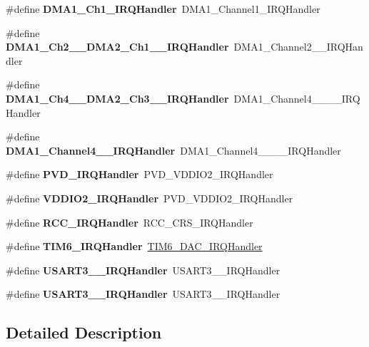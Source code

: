 \begin{DoxyCompactItemize}
\mbox{\label{group__stm32f072xb_ga3f7debe9fc2548ab6640825967110101}} 
\#define {\bfseries D\+M\+A1\+\_\+\+Ch1\+\_\+\+I\+R\+Q\+Handler}~D\+M\+A1\+\_\+\+Channel1\+\_\+\+I\+R\+Q\+Handler
\item 
\mbox{\label{group__stm32f072xb_ga3752ab0b9a6635ccd7bc87b99ee8fd9b}} 
\#define {\bfseries D\+M\+A1\+\_\+\+Ch2\+\_\+\_\+\+D\+M\+A2\+\_\+\+Ch1\+\_\+\_\+\+I\+R\+Q\+Handler}~D\+M\+A1\+\_\+\+Channel2\+\_\+\_\+\+I\+R\+Q\+Handler
\item 
\mbox{\label{group__stm32f072xb_ga035f9aa47c046222541cca70e281b415}} 
\#define {\bfseries D\+M\+A1\+\_\+\+Ch4\+\_\+\_\+\+D\+M\+A2\+\_\+\+Ch3\+\_\+\_\+\+I\+R\+Q\+Handler}~D\+M\+A1\+\_\+\+Channel4\+\_\+\_\+\_\+\_\+\+I\+R\+Q\+Handler
\item 
\mbox{\label{group__stm32f072xb_gac0e40c40e17f156c06448e594bf54eaf}} 
\#define {\bfseries D\+M\+A1\+\_\+\+Channel4\+\_\+\_\+\+I\+R\+Q\+Handler}~D\+M\+A1\+\_\+\+Channel4\+\_\+\_\+\_\+\_\+\+I\+R\+Q\+Handler
\item 
\mbox{\label{group__stm32f072xb_ga045476dfaec8c84f5e16b06b937c0c18}} 
\#define {\bfseries P\+V\+D\+\_\+\+I\+R\+Q\+Handler}~P\+V\+D\+\_\+\+V\+D\+D\+I\+O2\+\_\+\+I\+R\+Q\+Handler
\item 
\mbox{\label{group__stm32f072xb_gac1854dcfbcf2950cee25063d73a5edb0}} 
\#define {\bfseries V\+D\+D\+I\+O2\+\_\+\+I\+R\+Q\+Handler}~P\+V\+D\+\_\+\+V\+D\+D\+I\+O2\+\_\+\+I\+R\+Q\+Handler
\item 
\mbox{\label{group__stm32f072xb_ga5a6d083fa78461da86a717b28973e009}} 
\#define {\bfseries R\+C\+C\+\_\+\+I\+R\+Q\+Handler}~R\+C\+C\+\_\+\+C\+R\+S\+\_\+\+I\+R\+Q\+Handler
\item 
\mbox{\label{group__stm32f072xb_gae30e35a563a952a284f3f54d7f164ccd}} 
\#define {\bfseries T\+I\+M6\+\_\+\+I\+R\+Q\+Handler}~\hyperlink{group___h_a_l___time_base___t_i_m_ga0839a45f331c4c067939b9c4533bbf4d}{T\+I\+M6\+\_\+\+D\+A\+C\+\_\+\+I\+R\+Q\+Handler}
\item 
\mbox{\label{group__stm32f072xb_gaf04189172ff710986cd652a06e6f3f69}} 
\#define {\bfseries U\+S\+A\+R\+T3\+\_\+\_\+\+I\+R\+Q\+Handler}~U\+S\+A\+R\+T3\+\_\+\_\+\+I\+R\+Q\+Handler
\item 
\mbox{\label{group__stm32f072xb_ga36a6fa2533fdea503ca6341545d3148e}} 
\#define {\bfseries U\+S\+A\+R\+T3\+\_\+\_\+\+I\+R\+Q\+Handler}~U\+S\+A\+R\+T3\+\_\+\_\+\+I\+R\+Q\+Handler
\end{DoxyCompactItemize}


\subsection{Detailed Description}
